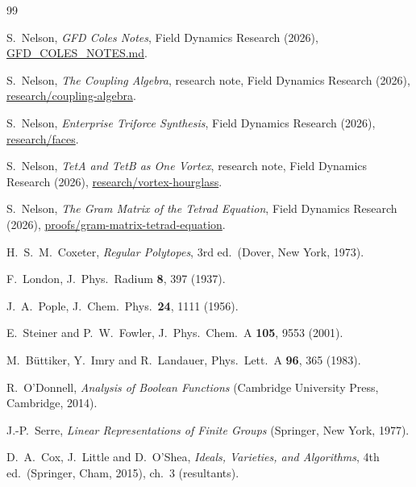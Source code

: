 \documentclass[twocolumn]{iopjournal}
\theoremstyle{definition}
\theoremstyle{remark}
\begin{document}
\begin{thebibliography}{99}

S.~Nelson,
\textit{GFD Coles Notes}, Field Dynamics Research (2026),
\url{GFD_COLES_NOTES.md}.

S.~Nelson,
\textit{The Coupling Algebra}, research note, Field Dynamics Research
(2026), \url{research/coupling-algebra}.

S.~Nelson,
\textit{Enterprise Triforce Synthesis}, Field Dynamics Research (2026),
\url{research/faces}.

S.~Nelson,
\textit{TetA and TetB as One Vortex}, research note, Field Dynamics
Research (2026), \url{research/vortex-hourglass}.

S.~Nelson,
\textit{The Gram Matrix of the Tetrad Equation},
Field Dynamics Research (2026),
\url{proofs/gram-matrix-tetrad-equation}.

H.~S.~M.~Coxeter,
\textit{Regular Polytopes},
3rd ed.\ (Dover, New York, 1973).

F.~London,
J.\ Phys.\ Radium \textbf{8}, 397 (1937).

J.~A.~Pople,
J.\ Chem.\ Phys.\ \textbf{24}, 1111 (1956).

E.~Steiner and P.~W.~Fowler,
J.\ Phys.\ Chem.\ A \textbf{105}, 9553 (2001).

M.~B\"uttiker, Y.~Imry and R.~Landauer,
Phys.\ Lett.\ A \textbf{96}, 365 (1983).

R.~O'Donnell,
\textit{Analysis of Boolean Functions}
(Cambridge University Press, Cambridge, 2014).

J.-P.~Serre,
\textit{Linear Representations of Finite Groups}
(Springer, New York, 1977).

D.~A.~Cox, J.~Little and D.~O'Shea,
\textit{Ideals, Varieties, and Algorithms},
4th ed.\ (Springer, Cham, 2015), ch.~3 (resultants).

\end{thebibliography}
\end{document}
